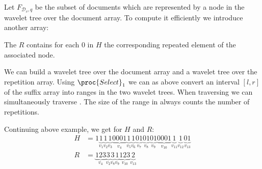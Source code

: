 Let $F_{\mathcal{D}_v, q}$ be the subset of documents which are represented by a node in the wavelet tree over the document array. To compute it efficiently we introduce another array:

\begin{Definition}
  The  $R$ contains for each $0$ in $H$ the corresponding repeated element of the associated node.
\end{Definition}

We can build a wavelet tree  over the document array and a wavelet tree  over the repetition array. Using $\proc{Select}_1$ we can as above convert an interval $[l,r]$ of the suffix array into ranges in the two wavelet trees. When traversing  we can simultaneously traverse . The size of the range in  always counts the number of repetitions.

\begin{Example}
  Continuing above example, we get for $H$ and $R$:
  \begin{align*}
    H &= 1
    \underbrace{1}_{v_1}
    \underbrace{1}_{v_2}
    \underbrace{1}_{v_3}
    \underbrace{0001}_{v_4}
    \underbrace{1}_{v_5}
    \underbrace{1}_{v_6}
    \underbrace{01}_{v_7}
    \underbrace{01}_{v_8}
    \underbrace{01}_{v_9}
    \underbrace{0001}_{v_{10}}
    \underbrace{1}_{v_{11}}
    \underbrace{1}_{v_{12}}
    \underbrace{01}_{v_{13}} \\
    R &=
    \underbrace{123}_{v_4}
    \underbrace{3}_{v_2}
    \underbrace{3}_{v_8}
    \underbrace{1}_{v_9}
    \underbrace{123}_{v_{10}}
    \underbrace{2}_{v_{13}}
  \end{align*}
\end{Example}
